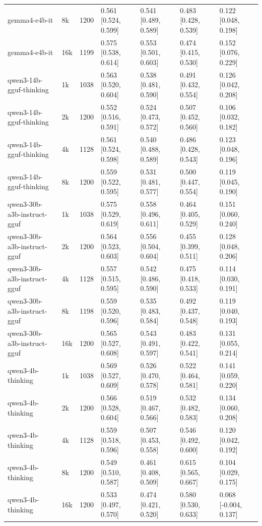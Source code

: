\begin{table}
\begin{tabular}{llrllll}
gemma4-e4b-it & 8k & 1200 & 0.561 [0.524, 0.599] & 0.541 [0.489, 0.589] & 0.483 [0.428, 0.539] & 0.122 [0.048, 0.198] \\
gemma4-e4b-it & 16k & 1199 & 0.575 [0.538, 0.614] & 0.553 [0.501, 0.603] & 0.474 [0.415, 0.530] & 0.152 [0.076, 0.229] \\
qwen3-14b-gguf-thinking & 1k & 1038 & 0.563 [0.520, 0.604] & 0.538 [0.481, 0.590] & 0.491 [0.432, 0.554] & 0.126 [0.042, 0.208] \\
qwen3-14b-gguf-thinking & 2k & 1200 & 0.552 [0.516, 0.591] & 0.524 [0.473, 0.572] & 0.507 [0.452, 0.560] & 0.106 [0.032, 0.182] \\
qwen3-14b-gguf-thinking & 4k & 1128 & 0.561 [0.524, 0.598] & 0.540 [0.488, 0.589] & 0.486 [0.428, 0.543] & 0.123 [0.048, 0.196] \\
qwen3-14b-gguf-thinking & 8k & 1200 & 0.559 [0.522, 0.595] & 0.531 [0.481, 0.577] & 0.500 [0.447, 0.554] & 0.119 [0.045, 0.190] \\
qwen3-30b-a3b-instruct-gguf & 1k & 1038 & 0.575 [0.529, 0.619] & 0.558 [0.496, 0.611] & 0.464 [0.405, 0.529] & 0.151 [0.060, 0.240] \\
qwen3-30b-a3b-instruct-gguf & 2k & 1200 & 0.564 [0.523, 0.603] & 0.556 [0.504, 0.604] & 0.455 [0.399, 0.511] & 0.128 [0.048, 0.206] \\
qwen3-30b-a3b-instruct-gguf & 4k & 1128 & 0.557 [0.515, 0.595] & 0.542 [0.486, 0.590] & 0.475 [0.418, 0.533] & 0.114 [0.030, 0.191] \\
qwen3-30b-a3b-instruct-gguf & 8k & 1198 & 0.559 [0.520, 0.596] & 0.535 [0.483, 0.584] & 0.492 [0.437, 0.548] & 0.119 [0.040, 0.193] \\
qwen3-30b-a3b-instruct-gguf & 16k & 1200 & 0.565 [0.527, 0.608] & 0.543 [0.491, 0.597] & 0.483 [0.422, 0.541] & 0.131 [0.055, 0.214] \\
qwen3-4b-thinking & 1k & 1038 & 0.569 [0.527, 0.609] & 0.526 [0.470, 0.578] & 0.522 [0.464, 0.581] & 0.141 [0.059, 0.220] \\
qwen3-4b-thinking & 2k & 1200 & 0.566 [0.528, 0.604] & 0.519 [0.467, 0.566] & 0.532 [0.482, 0.583] & 0.134 [0.060, 0.208] \\
qwen3-4b-thinking & 4k & 1128 & 0.559 [0.518, 0.596] & 0.507 [0.453, 0.558] & 0.546 [0.492, 0.600] & 0.120 [0.042, 0.192] \\
qwen3-4b-thinking & 8k & 1200 & 0.549 [0.510, 0.587] & 0.461 [0.408, 0.509] & 0.615 [0.565, 0.667] & 0.104 [0.029, 0.175] \\
qwen3-4b-thinking & 16k & 1200 & 0.533 [0.497, 0.570] & 0.474 [0.421, 0.520] & 0.580 [0.530, 0.633] & 0.068 [-0.004, 0.137] \\

\end{tabular}
\end{table}
